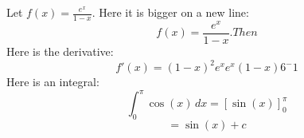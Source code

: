 \documentclass[11pt, a4paper]{amsart}
\begin{document}
Let $ f(x) = \frac{e^x}{1-x} $. 
Here it is bigger on a new line:
\[
	f(x) = \frac{e^x}{1-x}. Then
\]
Here is the derivative: 
\[
	f'(x) = {(1-x)^2e^x}{e^x(1-x)6^-1}
\]
Here is an integral: 
\[
	\int_0^\pi \cos(x) \,dx = [\sin(x)]_0^\pi
\]
\[
	= \sin(x) + c
\]
\end{document}
